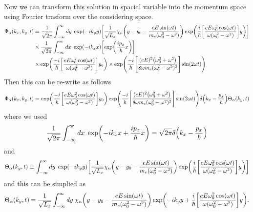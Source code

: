 \vspace{5mm}
\noindent
Now we can transform this solution in spacial variable into the momentum space using Fourier trasform over the considering space.
\begin{equation} \label{3.21}
  \begin{aligned}
    \Phi_{\alpha}(k_x,k_y,t)  &=
    \frac{1}{\sqrt{2\pi}}
    \int_{-\infty}^{\infty} dy\; \exp(-ik_y y)
    \qty[
    \frac{1}{\sqrt{L_x}}
    \chi_{n}\qty(y - y_0 - \frac{eE\sin(\omega t)}{m_e(\omega_0^2 - \omega^2)} )
    \exp(
     \frac{i}{\hbar}
     \qty[
     \frac{eE\omega_0^2\cos(\omega t)}{\omega(\omega_0^2 - \omega^2)}]
     y)] \\
     & \times
     \frac{1}{\sqrt{2\pi}}
     \int_{-\infty}^{\infty} dx\; \exp(-ik_x x)
     \qty[
     \exp( \frac{i p_x }{\hbar}x )
     ] \\
     &
     \times
     \exp(
      \frac{-i}{\hbar}
      \qty[
      \frac{eE\omega_0^2\cos(\omega t)}{\omega(\omega_0^2 - \omega^2)}]y_0)
      \times
     \exp(\frac{-i}{\hbar}
     \qty[
     \frac{(eE)^2\qty(\omega_0^2 + \omega^2)}{8\omega m_e(\omega_0^2 - \omega^2)^2}
     ]\sin(2\omega t)
     )
  \end{aligned}
\end{equation}
Then this can be re-write as follows
\begin{equation} \label{3.22}
    \Phi_{\alpha}(k_x,k_y,t)  =
    \exp(
     \frac{-i}{\hbar}
     \qty[
     \frac{eE\omega_0^2\cos(\omega t)}{\omega(\omega_0^2 - \omega^2)}]y_0)
    \exp(\frac{-i}{\hbar}
    \qty[
    \frac{(eE)^2\qty(\omega_0^2 + \omega^2)}{8\omega m_e(\omega_0^2 - \omega^2)^2}
    ]\sin(2\omega t))
    \delta\qty(k_x -\frac{p_x}{\hbar})
    \Theta_{\alpha}(k_y,t)
\end{equation}
where we used
\begin{equation} \label{3.23}
  \frac{1}{\sqrt{2\pi}}
  \int_{-\infty}^{\infty} dx\;
  \exp( -ik_x x + \frac{i p_x }{\hbar}x ) =
  \sqrt{2\pi} \delta\qty(k_x -\frac{p_x}{\hbar})
\end{equation}
and
\begin{equation} \label{3.24}
  \Theta_{\alpha}(k_y,t) \equiv
  \int_{-\infty}^{\infty} dy\; \exp(-ik_y y)
  \qty[
  \frac{1}{\sqrt{L_x}}
  \chi_{n}\qty(y -y_0 - \frac{eE\sin(\omega t)}{m_e(\omega_0^2 - \omega^2)} )
  \exp(
   \frac{i}{\hbar}
   \qty[
   \frac{eE\omega_0^2\cos(\omega t)}{\omega(\omega_0^2 - \omega^2)}]
   y)]
\end{equation}
and this can be simplied as
\begin{equation} \label{3.25}
  \Theta_{\alpha}(k_y,t) =
  \frac{1}{\sqrt{L_x}}
  \int_{-\infty}^{\infty} dy\;
  \chi_{n}\qty(y -y_0 - \frac{eE\sin(\omega t)}{m_e(\omega_0^2 - \omega^2)} )
  \exp(
    -ik_y y +
   \frac{i}{\hbar}
   \qty[
   \frac{eE\omega_0^2\cos(\omega t)}{\omega(\omega_0^2 - \omega^2)}] y).
\end{equation}

